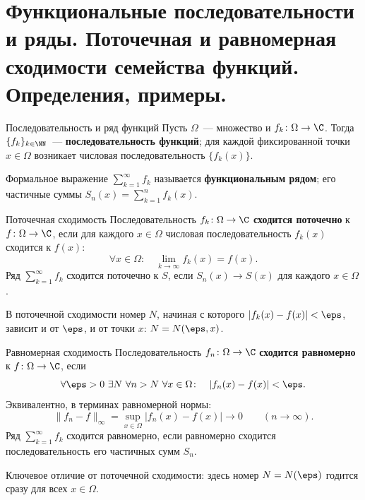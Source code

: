 
\section{Функциональные последовательности и ряды. Поточечная и равномерная сходимости семейства функций. Определения, примеры.}

\begin{Definition}{Последовательность и ряд функций}{}
	Пусть $\Omega$~--- множество и $f_k \colon \Omega \to \C$. Тогда $\{f_k\}_{k \in \NN}$~--- \textbf{последовательность функций}; для каждой фиксированной точки $x \in \Omega$ возникает числовая последовательность $\{f_k(x)\}$.

	Формальное выражение $\sum_{k=1}^{\infty} f_k$ называется \textbf{функциональным рядом}; его частичные суммы $S_n(x) = \sum_{k=1}^{n} f_k(x)$.
\end{Definition}

\begin{Definition}{Поточечная сходимость}{}
	Последовательность $f_k \colon \Omega \to \C$ \textbf{сходится поточечно} к $f \colon \Omega \to \C$, если для каждого $x \in \Omega$ числовая последовательность $f_k(x)$ сходится к $f(x)$:
	\[
	\forall x \in \Omega \colon \quad \lim_{k \to \infty} f_k(x) = f(x).
	\]
	Ряд $\sum_{k=1}^{\infty} f_k$ сходится поточечно к $S$, если $S_n(x) \to S(x)$ для каждого $x \in \Omega$.
\end{Definition}

\begin{Remark}{}{}
	В поточечной сходимости номер $N$, начиная с которого $|f_k(x) - f(x)| < \eps$, зависит и от $\eps$, и от точки $x$: $N = N(\eps, x)$.
\end{Remark}

\begin{Definition}[required]{Равномерная сходимость}{}
	Последовательность $f_n \colon \Omega \to \C$ \textbf{сходится равномерно} к $f \colon \Omega \to \C$, если
	\[
	\forall \eps > 0\ \exists N\ \forall n > N\ \forall x \in \Omega \colon \quad |f_n(x) - f(x)| < \eps.
	\]
	Эквивалентно, в терминах равномерной нормы:
	\[
	\|f_n - f\|_{\infty} = \sup_{x \in \Omega} |f_n(x) - f(x)| \longrightarrow 0 \qquad (n \to \infty).
	\]
	Ряд $\sum_{k=1}^{\infty} f_k$ сходится равномерно, если равномерно сходится последовательность его частичных сумм $S_n$.
\end{Definition}

Ключевое отличие от поточечной сходимости: здесь номер $N = N(\eps)$ годится сразу для всех $x \in \Omega$.

